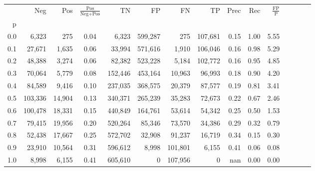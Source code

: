 \begin{tabular}{rrrcrrrrrrrrrrr}
\toprule
{} &      Neg &     Pos & $\frac{\text{Pos}}{\text{Neg}+\text{Pos}}$ &       TN &       FP &       FN &       TP &  Prec &   Rec & $\frac{\text{FP}}{\text{P}}$ \\
p   &          &         &                                            &          &          &          &          &       &       &                              \\
\midrule
0.0 &    6,323 &     275 &                                       0.04 &    6,323 &  599,287 &      275 &  107,681 &  0.15 &  1.00 &                         5.55 \\
0.1 &   27,671 &   1,635 &                                       0.06 &   33,994 &  571,616 &    1,910 &  106,046 &  0.16 &  0.98 &                         5.29 \\
0.2 &   48,388 &   3,274 &                                       0.06 &   82,382 &  523,228 &    5,184 &  102,772 &  0.16 &  0.95 &                         4.85 \\
0.3 &   70,064 &   5,779 &                                       0.08 &  152,446 &  453,164 &   10,963 &   96,993 &  0.18 &  0.90 &                         4.20 \\
0.4 &   84,589 &   9,416 &                                       0.10 &  237,035 &  368,575 &   20,379 &   87,577 &  0.19 &  0.81 &                         3.41 \\
0.5 &  103,336 &  14,904 &                                       0.13 &  340,371 &  265,239 &   35,283 &   72,673 &  0.22 &  0.67 &                         2.46 \\
0.6 &  100,478 &  18,331 &                                       0.15 &  440,849 &  164,761 &   53,614 &   54,342 &  0.25 &  0.50 &                         1.53 \\
0.7 &   79,415 &  19,956 &                                       0.20 &  520,264 &   85,346 &   73,570 &   34,386 &  0.29 &  0.32 &                         0.79 \\
0.8 &   52,438 &  17,667 &                                       0.25 &  572,702 &   32,908 &   91,237 &   16,719 &  0.34 &  0.15 &                         0.30 \\
0.9 &   23,910 &  10,564 &                                       0.31 &  596,612 &    8,998 &  101,801 &    6,155 &  0.41 &  0.06 &                         0.08 \\
1.0 &    8,998 &   6,155 &                                       0.41 &  605,610 &        0 &  107,956 &        0 &   nan &  0.00 &                         0.00 \\
\bottomrule
\end{tabular}
